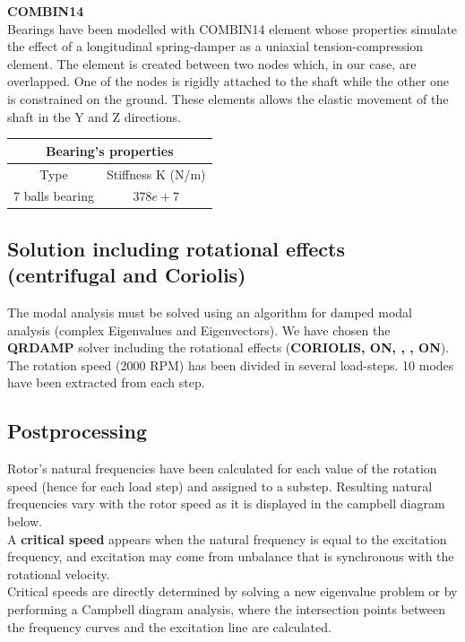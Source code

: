 \noindent
\textbf{COMBIN14} \\
Bearings have been modelled with COMBIN14 element whose properties simulate the effect of a longitudinal spring-damper as a uniaxial tension-compression element.
The element is created between two nodes which, in our case, are overlapped. One of the nodes is rigidly attached to the shaft while the other one is constrained on the ground. These elements allows the elastic movement of the shaft in the Y and Z directions. \\


\medskip
\begin{table}[h!]
	\centering
	
	\begin{tabular}{c c} 
		\toprule
		\multicolumn{2}{c}{Bearing's properties}\\
		\midrule
		Type & Stiffness K (N/m)  \\
		\midrule
		7 balls bearing & $378e+7$  \\ 
		\bottomrule
	\end{tabular}	
\end{table}
 

\clearpage
\subsection*{Solution including rotational effects (centrifugal and Coriolis)}
\noindent
The modal analysis must be solved using an algorithm for damped modal analysis (complex Eigenvalues and Eigenvectors). We have chosen the \textbf{QRDAMP} solver including the rotational effects (\textbf{CORIOLIS, ON, , , ON}). \\ The rotation speed (2000 RPM) has been divided in several load-steps. 10 modes have been extracted from each step. \\





\subsection*{Postprocessing}
\noindent
Rotor's natural frequencies have been calculated for each value of the rotation speed (hence for each load step) and assigned to a substep. Resulting natural frequencies vary with the rotor speed as it is displayed in the campbell diagram below. \\
A \textbf{critical speed} appears when the natural frequency is equal to the excitation frequency, and excitation may come from unbalance that is synchronous with the rotational velocity. \\
Critical speeds are directly determined by solving a new eigenvalue problem or by performing a Campbell diagram analysis, where the intersection points between the frequency curves and the excitation line are calculated.

